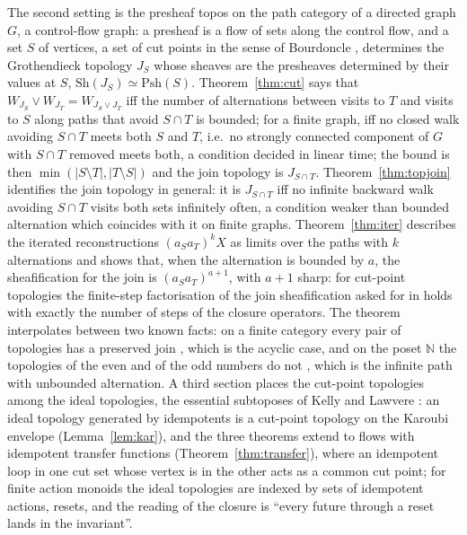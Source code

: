 \documentclass[11pt]{amsart}
\theoremstyle{definition}
\newcommand{\Psh}{\mathrm{Psh}}
\newcommand{\Sh}{\mathrm{Sh}}
\begin{document}
The second setting is the presheaf topos on the path category of a
directed graph $G$, a control-flow graph: a presheaf is a flow of sets
along the control flow, and a set $S$ of vertices, a set of cut points in
the sense of Bourdoncle \cite{Bourdoncle}, determines the Grothendieck
topology $J_S$ whose sheaves are the presheaves determined by their values
at $S$, $\Sh(J_S)\simeq\Psh(S)$. Theorem~\ref{thm:cut} says that
$W_{J_S}\vee W_{J_T}=W_{J_S\vee J_T}$ iff the number of alternations
between visits to $T$ and visits to $S$ along paths that avoid $S\cap T$
is bounded; for a finite graph, iff no closed walk avoiding $S\cap T$ meets
both $S$ and $T$, i.e.\ no strongly connected component of $G$ with
$S\cap T$ removed meets both, a condition decided in linear time; the
bound is then $\min(|S\setminus T|,|T\setminus S|)$ and the join topology
is $J_{S\cap T}$. Theorem~\ref{thm:topjoin} identifies the join topology
in general: it is $J_{S\cap T}$ iff no infinite backward walk avoiding
$S\cap T$ visits both sets infinitely often, a condition weaker than
bounded alternation which coincides with it on finite graphs.
Theorem~\ref{thm:iter} describes the iterated reconstructions
$(a_Sa_T)^kX$ as limits over the paths with $k$ alternations and shows
that, when the alternation is bounded by $a$, the sheafification for the
join is $(a_Sa_T)^{a+1}$, with $a+1$ sharp: for cut-point topologies the
finite-step factorisation of the join sheafification asked for in
\cite{Fijoin} holds with exactly the number of steps of the closure
operators. The theorem interpolates between two known
facts: on a finite category every pair of topologies has a preserved join
\cite{Finitejoin}, which is the acyclic case, and on the poset
$\mathbb N$ the topologies of the even and of the odd numbers do not
\cite{Topjoin}, which is the infinite path with unbounded alternation. A
third section places the cut-point topologies among the ideal
topologies, the essential subtoposes of Kelly and Lawvere \cite{KL89}:
an ideal topology generated by idempotents is a cut-point topology on
the Karoubi envelope (Lemma~\ref{lem:kar}), and the three theorems
extend to flows with idempotent transfer functions
(Theorem~\ref{thm:transfer}), where an idempotent loop in one cut set
whose vertex is in the other acts as a common cut point; for finite
action monoids the ideal topologies are indexed by sets of idempotent
actions, resets, and the reading of the closure is ``every future
through a reset lands in the invariant''.
\end{document}
